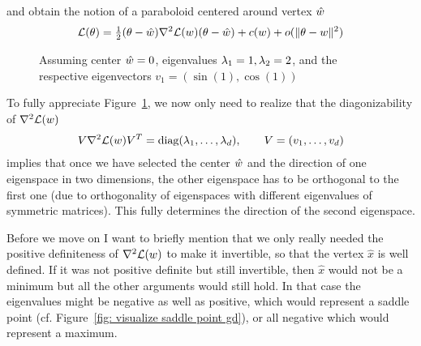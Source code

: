 %
and obtain the notion of a paraboloid centered around vertex \(\hat{w}\)
%
\begin{align}\label{paraboloid approximation of L}
	\mathcal{L}(\theta)
	= \tfrac12 (\theta- \hat{w}) \nabla^2 \mathcal{L}(w) (\theta-\hat{w})
	+ c(w) + o(\|\theta-w\|^2)
\end{align}
%
\begin{wrapfigure}{O}{0.65\textwidth}
	\centering
	\def\svgwidth{0.65\textwidth}
	
	\caption{Assuming center \(\hat{w}=0\), eigenvalues \(\lambda_1=1,
	\lambda_2=2\), and the respective eigenvectors \(v_1=(\sin(1), \cos(1))\)}
	\label{fig: 2d paraboloid}
\end{wrapfigure}
%
To fully appreciate Figure~\ref{fig: 2d paraboloid}, we now only need to realize
that the diagonizability of \(\nabla^2 \mathcal{L}(w)\)
%
\begin{align}\label{eq: diagnalization of the Hesse matrix}
	V \nabla^2 \mathcal{L}(w) V^T
	= \text{diag}(\lambda_1,\dots,\lambda_d), \qquad V=(v_1,\dots, v_d)
\end{align}
%
implies that once we have selected the center \(\hat{w}\) and the direction of
one eigenspace in two dimensions, the other eigenspace has to be
orthogonal to the first one (due to orthogonality of eigenspaces with different
eigenvalues of symmetric matrices). This fully determines the direction of the
second eigenspace.

Before we move on I want to briefly mention that we only really needed the
positive definiteness of \(\nabla^2 \mathcal{L}(w)\) to make it invertible, so that
the vertex \(\hat{x}\) is well defined. If it was not positive definite but still invertible,
then \(\hat{x}\) would not be a minimum but all the other arguments would still
hold.
In that case the eigenvalues might be negative as well as positive, which would
represent a saddle point (cf. Figure~\ref{fig: visualize saddle point gd}), or
all negative which would represent a maximum.

